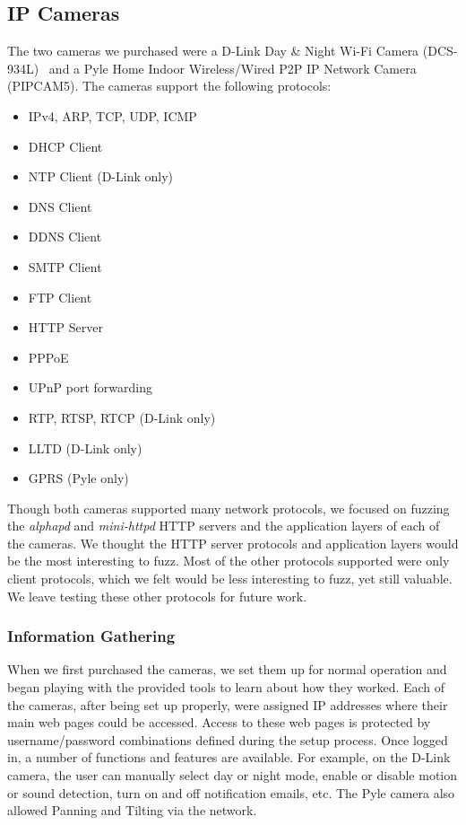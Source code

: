 \documentclass[letterpaper,twocolumn,10pt]{article}
\begin{document}
\subsection{IP Cameras}
The two cameras we purchased were a D-Link Day \& Night Wi-Fi Camera (DCS-934L)~\cite{dlinkCam} and a Pyle Home Indoor Wireless/Wired P2P IP Network Camera (PIPCAM5). The cameras support the following protocols:
\begin{itemize}
	\itemsep-.5em
	\item IPv4, ARP, TCP, UDP, ICMP
	\item DHCP Client
	\item NTP Client (D-Link only)
	\item DNS Client
	\item DDNS Client
	\item SMTP Client
	\item FTP Client
	\item HTTP Server
	\item PPPoE
	\item UPnP port forwarding
	\item RTP, RTSP, RTCP (D-Link only)
	\item LLTD (D-Link only)
	\item GPRS (Pyle only)
\end{itemize}
Though both cameras supported many network protocols, we focused on fuzzing the \textit{alphapd} and \textit{mini-httpd} HTTP servers and the application layers of each of the cameras. We thought the HTTP server protocols and application layers would be the most interesting to fuzz. Most of the other protocols supported were only client protocols, which we felt would be less interesting to fuzz, yet still valuable. We leave testing these other protocols for future work. 


\subsubsection{Information Gathering}
When we first purchased the cameras, we set them up for normal operation and began playing with the provided tools to learn about how they worked. Each of the cameras, after being set up properly, were assigned IP addresses where their main web pages could be accessed. Access to these web pages is protected by username/password combinations defined during the setup process. Once logged in, a number of functions and features are available. For example, on the D-Link camera, the user can manually select day or night mode, enable or disable motion or sound detection, turn on and off notification emails, etc. The Pyle camera also allowed Panning and Tilting via the network.
\end{document}
